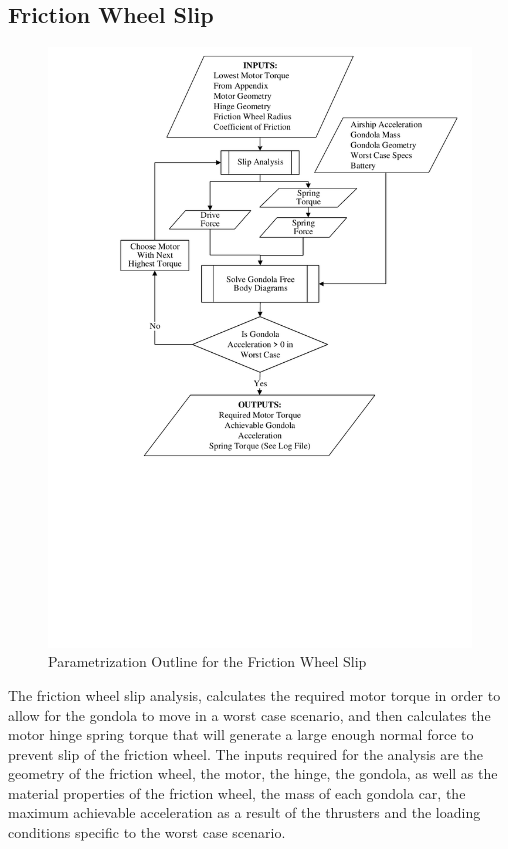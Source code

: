 \documentclass[../main.tex]{subfiles}
\begin{document}
\subsection{Friction Wheel Slip} \label{frictionSlip}
\begin{figure}[H]
	\centering
	\includegraphics[width=.9\linewidth]{img/paramaterization/fricWheelSlip.pdf}
	\caption{Parametrization Outline for the Friction Wheel Slip}
	\label{fig:frictionWheelParametrization}
\end{figure}

The friction wheel slip analysis, calculates the required motor torque in order to allow for the gondola to move in a worst case scenario, and then calculates the motor hinge spring torque that will generate a large enough normal force to prevent slip of the friction wheel. The inputs required for the analysis are the geometry of the friction wheel, the motor, the hinge, the gondola, as well as the material properties of the friction wheel, the mass of each gondola car, the maximum achievable acceleration as a result of the thrusters and the loading conditions specific to the worst case scenario. \\
\end{document}

